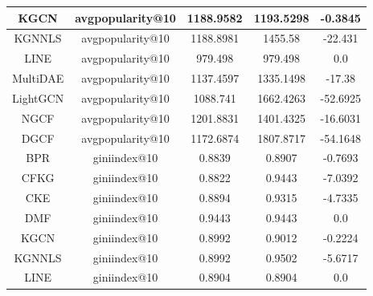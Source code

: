 \begin{table}[H]
{\begin{tabular}{|c|c|c|c|c|}
KGCN             & avgpopularity@10 & 1188.9582                     & 1193.5298                        & -0.3845                              \\ \hline
KGNNLS           & avgpopularity@10 & 1188.8981                     & 1455.58                          & -22.431                              \\ \hline
LINE             & avgpopularity@10 & 979.498                       & 979.498                          & 0.0                                  \\ \hline
MultiDAE         & avgpopularity@10 & 1137.4597                     & 1335.1498                        & -17.38                               \\ \hline
LightGCN         & avgpopularity@10 & 1088.741                      & 1662.4263                        & -52.6925                             \\ \hline
NGCF             & avgpopularity@10 & 1201.8831                     & 1401.4325                        & -16.6031                             \\ \hline
DGCF             & avgpopularity@10 & 1172.6874                     & 1807.8717                        & -54.1648                             \\ \hline
BPR              & giniindex@10     & 0.8839                        & 0.8907                           & -0.7693                              \\ \hline
CFKG             & giniindex@10     & 0.8822                        & 0.9443                           & -7.0392                              \\ \hline
CKE              & giniindex@10     & 0.8894                        & 0.9315                           & -4.7335                              \\ \hline
DMF              & giniindex@10     & 0.9443                        & 0.9443                           & 0.0                                  \\ \hline
KGCN             & giniindex@10     & 0.8992                        & 0.9012                           & -0.2224                              \\ \hline
KGNNLS           & giniindex@10     & 0.8992                        & 0.9502                           & -5.6717                              \\ \hline
LINE             & giniindex@10     & 0.8904                        & 0.8904                           & 0.0                                  \\ \hline

\end{tabular}}
\end{table}
